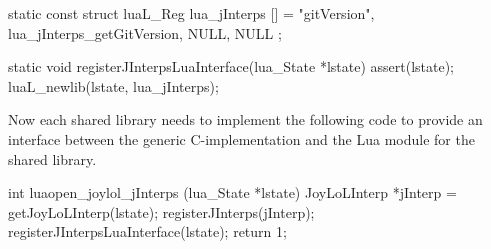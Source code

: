 \startCCode
static const struct luaL_Reg lua_jInterps [] = {
  {"gitVersion", lua_jInterps_getGitVersion},
  {NULL, NULL}
};
\stopCCode

\startCCode
static void registerJInterpsLuaInterface(lua_State *lstate) {
  assert(lstate);
  luaL_newlib(lstate, lua_jInterps);
}
\stopCCode

Now each shared library needs to implement the following code to provide 
an interface between the generic C-implementation and the Lua module for 
the shared library. 

\startCCode
int luaopen_joylol_jInterps (lua_State *lstate) {
  JoyLoLInterp *jInterp = getJoyLoLInterp(lstate);
  registerJInterps(jInterp);
  registerJInterpsLuaInterface(lstate);
  return 1;
}
\stopCCode